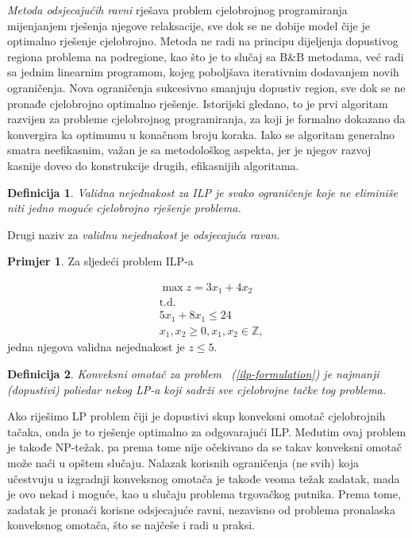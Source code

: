 \documentclass[a4paper, utf8, 11pt, colorlinks]{book}
\newtheorem{definition}{Definicija}[chapter]
\theoremstyle{definition}
\newtheorem{primjer}{Primjer}[chapter]
\begin{document}
\emph{Metoda odsjecajućih ravni} rješava problem cjelobrojnog  programiranja mijenjanjem rješenja njegove relaksacije, sve dok se ne dobije model čije je optimalno rješenje cjelobrojno. Metoda ne radi  na principu dijeljenja dopustivog regiona problema na podregione, kao što je to slučaj sa B\&B metodama, već radi sa jednim linearnim programom, kojeg poboljšava iterativnim dodavanjem novih ograničenja. Nova ograničenja sukcesivno smanjuju dopustiv region, sve dok se ne pronađe cjelobrojno optimalno rješenje.   
 Istorijski gledano, to je prvi algoritam razvijen za probleme cjelobrojnog programiranja, za koji je formalno dokazano da konvergira ka optimumu u konačnom broju koraka. Iako se algoritam generalno smatra   neefikasnim, važan je sa metodološkog aspekta, jer je njegov razvoj kasnije doveo do konstrukcije drugih, efikasnijih algoritama.  
  
 \begin{definition}{Validna nejednakost} za ILP je svako ograničenje koje ne eliminiše niti   jedno moguće cjelobrojno rješenje problema.
 \end{definition}
 Drugi naziv za \emph{validnu nejednakost} je \emph{odsjecajuća ravan}.

\begin{primjer}
Za sljedeći problem ILP-a
\end{primjer}
\begin{align*}
    &\max z = 3x_1 + 4 x_2 \\
    &\mbox{t.d.} \\
    &5x_1 + 8x_1 \leq 24 \\
    & x_1, x_2 \geq 0, x_1,x_2\in \mathbb{Z},
\end{align*}
jedna njegova validna nejednakost je $z \leq 5$. 

\begin{definition}
      Konveksni omotač za problem  ~(\ref{ilp-formulation}) je najmanji (dopustivi) poliedar nekog LP-a koji sadrži sve cjelobrojne tačke tog problema.
\end{definition}
Ako riješimo LP problem čiji je dopustivi skup konveksni omotač cjelobrojnih tačaka, onda je to rješenje optimalno za odgovarajući ILP. Međutim ovaj problem je takođe  NP-težak, pa prema tome nije očekivano da se takav konveksni omotač može naći u opštem slučaju. Nalazak korisnih ograničenja (ne svih) koja učestvuju u izgradnji konveksnog omotača je takođe veoma težak zadatak, mada je ovo nekad i moguće, kao u slučaju problema trgovačkog putnika. Prema tome, zadatak je pronaći korisne odsjecajuće ravni, nezavisno od problema pronalaska konveksnog omotača, što se najčeše i radi  u praksi. 
\end{document}
